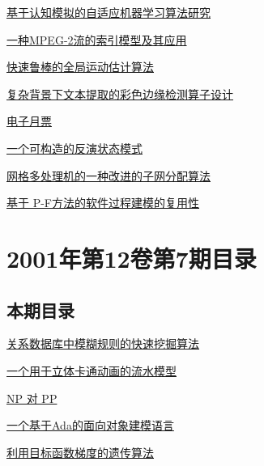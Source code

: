 \documentclass[a4paper]{article}
\begin{document}
\href{http://www.jos.org.cn/ch/reader/download_pdf.aspx?file_no=20010813&year_id=2001&quarter_id=8&falg=1}{基于认知模拟的自适应机器学习算法研究}

\href{http://www.jos.org.cn/ch/reader/download_pdf.aspx?file_no=20010814&year_id=2001&quarter_id=8&falg=1}{一种MPEG-2流的索引模型及其应用}

\href{http://www.jos.org.cn/ch/reader/download_pdf.aspx?file_no=20010815&year_id=2001&quarter_id=8&falg=1}{快速鲁棒的全局运动估计算法}

\href{http://www.jos.org.cn/ch/reader/download_pdf.aspx?file_no=20010816&year_id=2001&quarter_id=8&falg=1}{复杂背景下文本提取的彩色边缘检测算子设计}

\href{http://www.jos.org.cn/ch/reader/download_pdf.aspx?file_no=20010817&year_id=2001&quarter_id=8&falg=1}{电子月票}

\href{http://www.jos.org.cn/ch/reader/download_pdf.aspx?file_no=20010818&year_id=2001&quarter_id=8&falg=1}{一个可构造的反演状态模式}

\href{http://www.jos.org.cn/ch/reader/download_pdf.aspx?file_no=20010819&year_id=2001&quarter_id=8&falg=1}{网格多处理机的一种改进的子网分配算法}

\href{http://www.jos.org.cn/ch/reader/download_pdf.aspx?file_no=20010820&year_id=2001&quarter_id=8&falg=1}{基于 P-F方法的软件过程建模的复用性}


\section{\textbf{2001年第12卷第7期目录}}
\subsection{本期目录}
\href{http://www.jos.org.cn/ch/reader/download_pdf.aspx?file_no=20010701&year_id=2001&quarter_id=7&falg=1}{关系数据库中模糊规则的快速挖掘算法}

\href{http://www.jos.org.cn/ch/reader/download_pdf.aspx?file_no=20010702&year_id=2001&quarter_id=7&falg=1}{一个用于立体卡通动画的流水模型}

\href{http://www.jos.org.cn/ch/reader/download_pdf.aspx?file_no=20010703&year_id=2001&quarter_id=7&falg=1}{NP 对 PP}

\href{http://www.jos.org.cn/ch/reader/download_pdf.aspx?file_no=20010704&year_id=2001&quarter_id=7&falg=1}{一个基于Ada的面向对象建模语言}

\href{http://www.jos.org.cn/ch/reader/download_pdf.aspx?file_no=20010705&year_id=2001&quarter_id=7&falg=1}{利用目标函数梯度的遗传算法}
\end{document}
